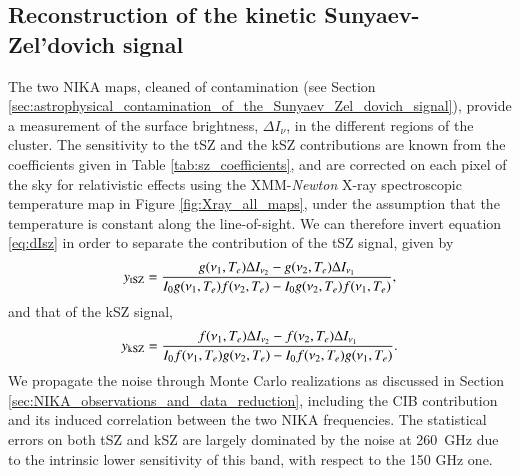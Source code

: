 \documentclass[twocolumn,traditabstract]{aa}
\begin{document}
\subsection{Reconstruction of the kinetic Sunyaev-Zel'dovich signal}\label{sec:Reconstruction_of_the_kinetic_Sunyaev_Zeldovich_signal}
The two NIKA maps, cleaned of contamination (see Section \ref{sec:astrophysical_contamination_of_the_Sunyaev_Zel_dovich_signal}), provide a measurement of the surface brightness, $\Delta I_{\nu}$, in the different regions of the cluster. The sensitivity to the tSZ and the kSZ contributions are known from the coefficients given in Table \ref{tab:sz_coefficients}, and are corrected on each pixel of the sky for relativistic effects using the XMM-\textit{Newton} X-ray spectroscopic temperature map in Figure \ref{fig:Xray_all_maps}, under the assumption that the temperature is constant along the line-of-sight. We can therefore invert equation \ref{eq:dIsz} in order to separate the contribution of the tSZ signal, given by
\begin{equation}
	y_{\rm tSZ} = \frac{g(\nu_1, T_e) \Delta I_{\nu_2} - g(\nu_2, T_e) \Delta I_{\nu_1}}{I_0 g(\nu_1, T_e) f(\nu_2, T_e) - I_0 g(\nu_2, T_e) f(\nu_1, T_e)},
\label{eq:measurement_ytsz}
\end{equation}
and that of the kSZ signal,
\begin{equation}
	y_{\rm kSZ} = \frac{f(\nu_1, T_e) \Delta I_{\nu_2} - f(\nu_2, T_e) \Delta I_{\nu_1}}{I_0 f(\nu_1, T_e) g(\nu_2, T_e) - I_0 f(\nu_2, T_e) g(\nu_1, T_e)}.
\label{eq:measurement_yksz}
\end{equation}
We propagate the noise through Monte Carlo realizations as discussed in Section \ref{sec:NIKA_observations_and_data_reduction}, including the CIB contribution and its induced correlation between the two NIKA frequencies. The statistical errors on both tSZ and kSZ are largely dominated by the noise at 260~GHz due to the intrinsic lower sensitivity of this band, with respect to the 150 GHz one. 

\end{document}
